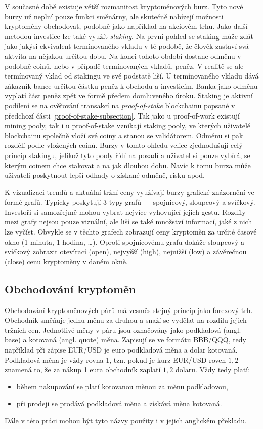 V současné době existuje větší rozmanitost kryptoměnových burz. Tyto nové burzy už neplní pouze funkci směnárny, ale skutečně nabízejí možnosti
kryptoměny obchodovat, podobně jako například na akciovém trhu. Jako další metodou investice lze také využít \emph{staking}. Na první pohled se staking
může zdát jako jakýsi ekvivalent termínovaného vkladu v té podobě, že člověk zastaví svá aktvita na nějakou určitou dobu. Na konci tohoto období dostane
odměnu v podobně coinů, nebo v případě termínovaných vkladů, peněz. V realitě se ale termínovaný vklad od stakingu ve své podstatě liší. U termínovaného
vkladu dává zákazník bance určitou částku peněz k obchodu a investicím. Banka jako odměnu vyplatí část peněz zpět ve formě předem domluveného úroku.
Staking je aktivní podílení se na ověřování transakcí na \emph{proof-of-stake} blockchainu popsané v předchozí části
\ref{proof-of-stake-subsection}. Tak jako u proof-of-work existují mining pooly, tak i u proof-of-stake vznikají staking pooly, ve kterých uživatelé
blockchainu společně vloží své coiny a stanou se validátorem. Odměnu si pak rozdělí podle vložených coinů. Burzy v tomto ohledu velice zjednodušují
celý princip stakingu, jelikož tyto pooly řídí na pozadí a uživatel si pouze vybírá, se kterým coinem chce stakovat a na jak dlouhou dobu. Navíc k tomu
burza může uživateli poskytnout lepší odhady o získané odměně, risku apod.

K vizualizaci trendů a aktuální tržní ceny využívají burzy grafické znázornění ve formě grafů. Typicky poskytují 3 typy grafů --- spojnicový, sloupcový a svíčkový.
Investoři si samozřejmě mohou vybrat nejvíce vyhovující jejich gestu. Rozdíly mezi grafy nejsou pouze vizuální, ale liší se také množství informací, jaké z nich lze vyčíst.
Obvykle se v těchto grafech zobrazují ceny kryptoměn za určité časové okno (1 minuta, 1 hodina, \ldots). Oproti spojnicovému grafu dokáže sloupcový a svíčkový
zobrazit otevírací (open), nejvyšší (high), nejnižší (low) a závěrečnou (close) cenu kryptoměny v daném okně.

\subsection{Obchodování kryptoměn}
Obchodování kryptoměnových párů má vesměs stejný princip jako forexový trh. Obchodník směňuje jednu měnu za druhou a snaží se vydělat na rozdílu jejich tržních cen.
Jednotlivé měny v páru jsou označovány jako podkladová (angl. base) a kotovaná (angl. quote) měna. Zapisují se ve formátu {BBB/QQQ}, tedy například při zápise
EUR/USD je euro podkladová měna a dolar kotovaná. Podkladová měna je vždy rovna 1, tzn. pokud je kurz EUR/USD roven $1,2$ znamená to, že za nákup 1 eura
obchodník zaplatí $1,2$ dolaru. Vždy tedy platí:
\begin{itemize}
    \item během nakupování se platí kotovanou měnou za měnu podkladovou,
    \item při prodeji se prodává podkladová měna a získává měna kotovaná.
\end{itemize}
Dále v této práci mohou být tyto názvy použity i v jejich anglickém překladu.

